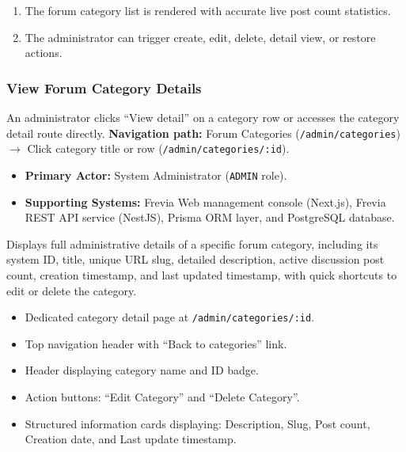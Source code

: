 \begin{enumerate}[leftmargin=1.6em,topsep=3pt,itemsep=2pt,parsep=0pt]
    \item The forum category list is rendered with accurate live post count statistics.
    \item The administrator can trigger create, edit, delete, detail view, or restore actions.
\end{enumerate}

\subsubsection{ View Forum Category Details}

An administrator clicks ``View detail'' on a category row or accesses the category detail route directly.\newline
\textbf{Navigation path:} Forum Categories (\texttt{/admin/categories}) $\rightarrow$ Click category title or row (\texttt{/admin/categories/:id}).


\begin{itemize}[leftmargin=1.6em,topsep=3pt,itemsep=2pt,parsep=0pt,label=$\bullet$]
    \item \textbf{Primary Actor:} System Administrator (\texttt{ADMIN} role).
    \item \textbf{Supporting Systems:} Frevia Web management console (Next.js), Frevia REST API service (NestJS), Prisma ORM layer, and PostgreSQL database.
\end{itemize}

\noindent Displays full administrative details of a specific forum category, including its system ID, title, unique URL slug, detailed description, active discussion post count, creation timestamp, and last updated timestamp, with quick shortcuts to edit or delete the category.

\begin{itemize}[leftmargin=1.6em,topsep=3pt,itemsep=2pt,parsep=0pt,label=$\bullet$]
    \item Dedicated category detail page at \texttt{/admin/categories/:id}.
    \item Top navigation header with ``Back to categories'' link.
    \item Header displaying category name and ID badge.
    \item Action buttons: ``Edit Category'' and ``Delete Category''.
    \item Structured information cards displaying: Description, Slug, Post count, Creation date, and Last update timestamp.
\end{itemize}

